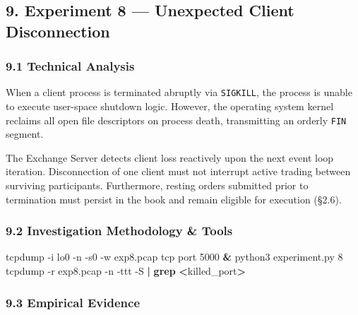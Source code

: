 \documentclass[
]{article}
\newenvironment{Shaded}{\begin{snugshade}}{\end{snugshade}}
\newcommand{\AttributeTok}[1]{\textcolor[rgb]{0.13,0.29,0.53}{#1}}
\newcommand{\ExtensionTok}[1]{#1}
\newcommand{\FunctionTok}[1]{\textcolor[rgb]{0.13,0.29,0.53}{\textbf{#1}}}
\newcommand{\KeywordTok}[1]{\textcolor[rgb]{0.13,0.29,0.53}{\textbf{#1}}}
\newcommand{\NormalTok}[1]{#1}
\newcommand{\OperatorTok}[1]{\textcolor[rgb]{0.81,0.36,0.00}{\textbf{#1}}}
\newcommand{\StringTok}[1]{\textcolor[rgb]{0.31,0.60,0.02}{#1}}
\begin{document}
\hypertarget{experiment-8-unexpected-client-disconnection}{%
\subsection{9. Experiment 8 --- Unexpected Client
Disconnection}\label{experiment-8-unexpected-client-disconnection}}

\hypertarget{technical-analysis-6}{%
\subsubsection{9.1 Technical Analysis}\label{technical-analysis-6}}

When a client process is terminated abruptly via \texttt{SIGKILL}, the
process is unable to execute user-space shutdown logic. However, the
operating system kernel reclaims all open file descriptors on process
death, transmitting an orderly \texttt{FIN} segment.

The Exchange Server detects client loss reactively upon the next event
loop iteration. Disconnection of one client must not interrupt active
trading between surviving participants. Furthermore, resting orders
submitted prior to termination must persist in the book and remain
eligible for execution (§2.6).

\hypertarget{investigation-methodology-tools-5}{%
\subsubsection{9.2 Investigation Methodology \&
Tools}\label{investigation-methodology-tools-5}}

\begin{Shaded}
\begin{Highlighting}[]
\ExtensionTok{tcpdump} \AttributeTok{{-}i}\NormalTok{ lo0 }\AttributeTok{{-}n} \AttributeTok{{-}s0} \AttributeTok{{-}w}\NormalTok{ exp8.pcap }\StringTok{\textquotesingle{}tcp port 5000\textquotesingle{}} \KeywordTok{\&}
\ExtensionTok{python3}\NormalTok{ experiment.py 8}
\ExtensionTok{tcpdump} \AttributeTok{{-}r}\NormalTok{ exp8.pcap }\AttributeTok{{-}n} \AttributeTok{{-}ttt} \AttributeTok{{-}S} \KeywordTok{|} \FunctionTok{grep} \OperatorTok{\textless{}}\NormalTok{killed\_port}\OperatorTok{\textgreater{}}
\end{Highlighting}
\end{Shaded}

\hypertarget{empirical-evidence-6}{%
\subsubsection{9.3 Empirical Evidence}\label{empirical-evidence-6}}
\end{document}
